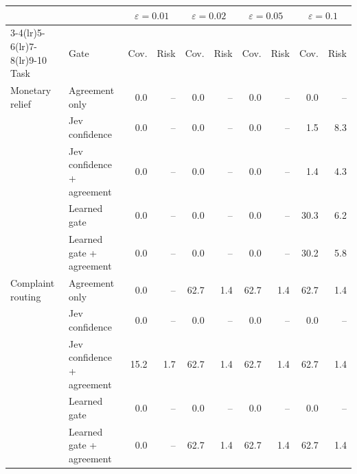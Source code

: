 \begin{tabular}{@{}llrrrrrrrr@{}}
\toprule
 & & \multicolumn{2}{c}{$\varepsilon=0.01$} & \multicolumn{2}{c}{$\varepsilon=0.02$} & \multicolumn{2}{c}{$\varepsilon=0.05$} & \multicolumn{2}{c}{$\varepsilon=0.1$} \\
\cmidrule(lr){3-4}\cmidrule(lr){5-6}\cmidrule(lr){7-8}\cmidrule(lr){9-10}
Task & Gate & Cov. & Risk & Cov. & Risk & Cov. & Risk & Cov. & Risk \\
\midrule
Monetary relief & Agreement only & 0.0 & -- & 0.0 & -- & 0.0 & -- & 0.0 & -- \\
 & Jev confidence & 0.0 & -- & 0.0 & -- & 0.0 & -- & 1.5 & 8.3 \\
 & Jev confidence + agreement & 0.0 & -- & 0.0 & -- & 0.0 & -- & 1.4 & 4.3 \\
 & Learned gate & 0.0 & -- & 0.0 & -- & 0.0 & -- & 30.3 & 6.2 \\
 & Learned gate + agreement & 0.0 & -- & 0.0 & -- & 0.0 & -- & 30.2 & 5.8 \\
\midrule
Complaint routing & Agreement only & 0.0 & -- & 62.7 & 1.4 & 62.7 & 1.4 & 62.7 & 1.4 \\
 & Jev confidence & 0.0 & -- & 0.0 & -- & 0.0 & -- & 0.0 & -- \\
 & Jev confidence + agreement & 15.2 & 1.7 & 62.7 & 1.4 & 62.7 & 1.4 & 62.7 & 1.4 \\
 & Learned gate & 0.0 & -- & 0.0 & -- & 0.0 & -- & 0.0 & -- \\
 & Learned gate + agreement & 0.0 & -- & 62.7 & 1.4 & 62.7 & 1.4 & 62.7 & 1.4 \\
\bottomrule
\end{tabular}
